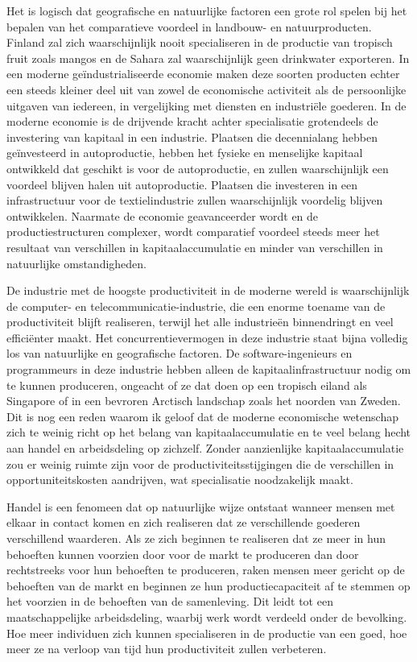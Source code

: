 Het is logisch dat geografische en natuurlijke factoren een grote rol spelen bij het bepalen van het comparatieve voordeel in landbouw- en natuurproducten. Finland zal zich waarschijnlijk nooit specialiseren in de productie van tropisch fruit zoals mango\textquotesingle s en de Sahara zal waarschijnlijk geen drinkwater exporteren. In een moderne geïndustrialiseerde economie maken deze soorten producten echter een steeds kleiner deel uit van zowel de economische activiteit als de persoonlijke uitgaven van iedereen, in vergelijking met diensten en industriële goederen. In de moderne economie is de drijvende kracht achter specialisatie grotendeels de investering van kapitaal in een industrie. Plaatsen die decennialang hebben geïnvesteerd in autoproductie, hebben het fysieke en menselijke kapitaal ontwikkeld dat geschikt is voor de autoproductie, en zullen waarschijnlijk een voordeel blijven halen uit autoproductie. Plaatsen die investeren in een infrastructuur voor de textielindustrie zullen waarschijnlijk voordelig blijven ontwikkelen. Naarmate de economie geavanceerder wordt en de productiestructuren complexer, wordt comparatief voordeel steeds meer het resultaat van verschillen in kapitaalaccumulatie en minder van verschillen in natuurlijke omstandigheden.

De industrie met de hoogste productiviteit in de moderne wereld is waarschijnlijk de computer- en telecommunicatie-industrie, die een enorme toename van de productiviteit blijft realiseren, terwijl het alle industrieën binnendringt en veel efficiënter maakt. Het concurrentievermogen in deze industrie staat bijna volledig los van natuurlijke en geografische factoren. De software-ingenieurs en programmeurs in deze industrie hebben alleen de kapitaalinfrastructuur nodig om te kunnen produceren, ongeacht of ze dat doen op een tropisch eiland als Singapore of in een bevroren Arctisch landschap zoals het noorden van Zweden. Dit is nog een reden waarom ik geloof dat de moderne economische wetenschap zich te weinig richt op het belang van kapitaalaccumulatie en te veel belang hecht aan handel en arbeidsdeling op zichzelf. Zonder aanzienlijke kapitaalaccumulatie zou er weinig ruimte zijn voor de productiviteitsstijgingen die de verschillen in opportuniteitskosten aandrijven, wat specialisatie noodzakelijk maakt.

Handel is een fenomeen dat op natuurlijke wijze ontstaat wanneer mensen met elkaar in contact komen en zich realiseren dat ze verschillende goederen verschillend waarderen. Als ze zich beginnen te realiseren dat ze meer in hun behoeften kunnen voorzien door voor de markt te produceren dan door rechtstreeks voor hun behoeften te produceren, raken mensen meer gericht op de behoeften van de markt en beginnen ze hun productiecapaciteit af te stemmen op het voorzien in de behoeften van de samenleving. Dit leidt tot een maatschappelijke arbeidsdeling, waarbij werk wordt verdeeld onder de bevolking. Hoe meer individuen zich kunnen specialiseren in de productie van een goed, hoe meer ze na verloop van tijd hun productiviteit zullen verbeteren.

